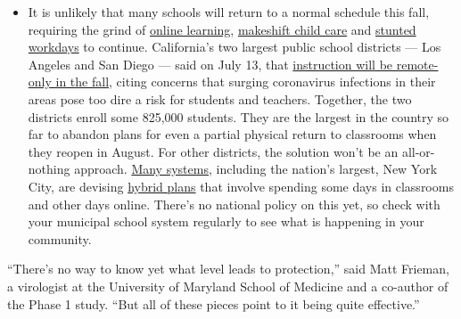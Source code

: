\begin{itemize}
  \begin{itemize}
  \tightlist
  \item
    It is unlikely that many schools will return to a normal schedule
    this fall, requiring the grind of
    \href{https://www.nytimes3xbfgragh.onion/2020/06/05/us/coronavirus-education-lost-learning.html?action=click\&pgtype=Article\&state=default\&region=MAIN_CONTENT_3\&context=storylines_faq}{online
    learning},
    \href{https://www.nytimes3xbfgragh.onion/2020/05/29/us/coronavirus-child-care-centers.html?action=click\&pgtype=Article\&state=default\&region=MAIN_CONTENT_3\&context=storylines_faq}{makeshift
    child care} and
    \href{https://www.nytimes3xbfgragh.onion/2020/06/03/business/economy/coronavirus-working-women.html?action=click\&pgtype=Article\&state=default\&region=MAIN_CONTENT_3\&context=storylines_faq}{stunted
    workdays} to continue. California's two largest public school
    districts --- Los Angeles and San Diego --- said on July 13, that
    \href{https://www.nytimes3xbfgragh.onion/2020/07/13/us/lausd-san-diego-school-reopening.html?action=click\&pgtype=Article\&state=default\&region=MAIN_CONTENT_3\&context=storylines_faq}{instruction
    will be remote-only in the fall}, citing concerns that surging
    coronavirus infections in their areas pose too dire a risk for
    students and teachers. Together, the two districts enroll some
    825,000 students. They are the largest in the country so far to
    abandon plans for even a partial physical return to classrooms when
    they reopen in August. For other districts, the solution won't be an
    all-or-nothing approach.
    \href{https://bioethics.jhu.edu/research-and-outreach/projects/eschool-initiative/school-policy-tracker/}{Many
    systems}, including the nation's largest, New York City, are
    devising
    \href{https://www.nytimes3xbfgragh.onion/2020/06/26/us/coronavirus-schools-reopen-fall.html?action=click\&pgtype=Article\&state=default\&region=MAIN_CONTENT_3\&context=storylines_faq}{hybrid
    plans} that involve spending some days in classrooms and other days
    online. There's no national policy on this yet, so check with your
    municipal school system regularly to see what is happening in your
    community.
  \end{itemize}
\end{itemize}

``There's no way to know yet what level leads to protection,'' said Matt
Frieman, a virologist at the University of Maryland School of Medicine
and a co-author of the Phase 1 study. ``But all of these pieces point to
it being quite effective.''

